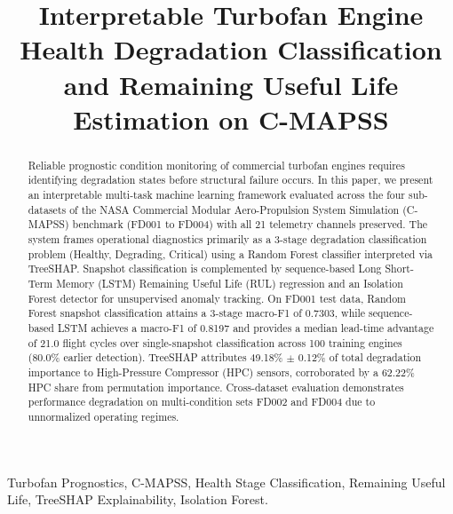 \documentclass[conference]{IEEEtran}
\begin{document}
\title{Interpretable Turbofan Engine Health Degradation Classification and Remaining Useful Life Estimation on C-MAPSS}

\author{
}

\maketitle

\begin{abstract}
Reliable prognostic condition monitoring of commercial turbofan engines requires identifying degradation states before structural failure occurs. In this paper, we present an interpretable multi-task machine learning framework evaluated across the four sub-datasets of the NASA Commercial Modular Aero-Propulsion System Simulation (C-MAPSS) benchmark (FD001 to FD004) with all 21 telemetry channels preserved. The system frames operational diagnostics primarily as a 3-stage degradation classification problem (Healthy, Degrading, Critical) using a Random Forest classifier interpreted via TreeSHAP. Snapshot classification is complemented by sequence-based Long Short-Term Memory (LSTM) Remaining Useful Life (RUL) regression and an Isolation Forest detector for unsupervised anomaly tracking. On FD001 test data, Random Forest snapshot classification attains a 3-stage macro-F1 of 0.7303, while sequence-based LSTM achieves a macro-F1 of 0.8197 and provides a median lead-time advantage of 21.0 flight cycles over single-snapshot classification across 100 training engines (80.0\% earlier detection). TreeSHAP attributes 49.18\% $\pm$ 0.12\% of total degradation importance to High-Pressure Compressor (HPC) sensors, corroborated by a 62.22\% HPC share from permutation importance. Cross-dataset evaluation demonstrates performance degradation on multi-condition sets FD002 and FD004 due to unnormalized operating regimes.
\end{abstract}

\begin{IEEEkeywords}
Turbofan Prognostics, C-MAPSS, Health Stage Classification, Remaining Useful Life, TreeSHAP Explainability, Isolation Forest.
\end{IEEEkeywords}
\end{document}
